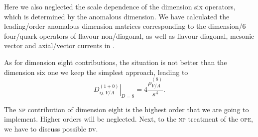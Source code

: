 \documentclass[../../index.tex]{subfiles}
\begin{document}
Here we also neglected the scale dependence of the dimension six operators, which
is determined by the anomalous dimension. We have calculated the leading\-/order
anomalous dimension matrices corresponding to the dimension\-/6 four\-/quark
operators of flavour non\-/diagonal, as well as flavour diagonal, mesonic vector
and axial\-/vector currents in \cite{Boito2015}.

As for dimension eight contributions, the situation is not better than the
dimension six one we keep the simplest approach, leading to
\begin{equation}
  \left. D_{ij,V/A}^{(1+0)} \right\rvert_{D=8} = 4 \frac{\rho_{V/A}^{(8)}}{s^4}.
\end{equation}

The \textsc{np} contribution of dimension eight is the highest order that we are
going to implement. Higher orders will be neglected. Next, to the \textsc{np}
treatment of the \textsc{ope}, we have to discuss possible \textsc{dv}.
\end{document}
